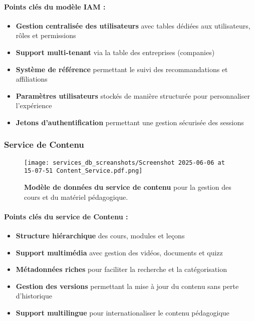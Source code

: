\paragraph{Points clés du modèle IAM :}
\begin{itemize}[leftmargin=*,noitemsep,topsep=0pt]
  \item \textbf{Gestion centralisée des utilisateurs} avec tables dédiées aux utilisateurs, rôles et permissions
  \item \textbf{Support multi-tenant} via la table des entreprises (companies)
  \item \textbf{Système de référence} permettant le suivi des recommandations et affiliations
  \item \textbf{Paramètres utilisateurs} stockés de manière structurée pour personnaliser l'expérience
  \item \textbf{Jetons d'authentification} permettant une gestion sécurisée des sessions
\end{itemize}
\normalsize
\newpage

\subsubsection{Service de Contenu}
\begin{figure}[h!]
  \centering
  \texttt{[image: services\_db\_screanshots/Screenshot 2025-06-06 at 15-07-51 Content\_Service.pdf.png]}
  \caption{\textbf{Modèle de données du service de contenu} pour la gestion des cours et du matériel pédagogique.}
  \label{fig:content_service}
\end{figure}
\vspace{-10pt}
\small
\paragraph{Points clés du service de Contenu :}
\begin{itemize}[leftmargin=*,noitemsep,topsep=0pt]
  \item \textbf{Structure hiérarchique} des cours, modules et leçons
  \item \textbf{Support multimédia} avec gestion des vidéos, documents et quizz
  \item \textbf{Métadonnées riches} pour faciliter la recherche et la catégorisation
  \item \textbf{Gestion des versions} permettant la mise à jour du contenu sans perte d'historique
  \item \textbf{Support multilingue} pour internationaliser le contenu pédagogique
\end{itemize}
\normalsize
\newpage

